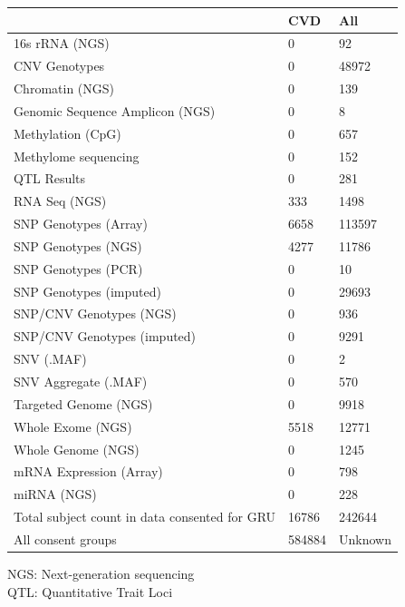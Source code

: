 \documentclass[letter]{bioinfo}
\begin{document}
	
			\begin{table}[]
{\begin{tabular}{l l l}
			\toprule
			& \textbf{CVD} &  \textbf{All}                         \\ \midrule
			16s rRNA (NGS)                 &     0 &      92 \\
			CNV Genotypes                  &     0 &   48972 \\
			Chromatin (NGS)                &     0 &     139 \\
			Genomic Sequence Amplicon (NGS)&     0 &       8 \\
			Methylation (CpG)              &     0 &     657 \\
			Methylome sequencing           &     0 &     152 \\
			QTL Results                    &     0 &     281 \\
			RNA Seq (NGS)                  &   333 &    1498 \\
			SNP Genotypes (Array)          &  6658 &  113597 \\
			SNP Genotypes (NGS)            &  4277 &   11786 \\
			SNP Genotypes (PCR)            &     0 &      10 \\
			SNP Genotypes (imputed)        &     0 &   29693 \\
			SNP/CNV Genotypes (NGS)        &     0 &     936 \\
			SNP/CNV Genotypes (imputed)    &     0 &    9291 \\
			SNV (.MAF)                     &     0 &       2 \\
			SNV Aggregate (.MAF)           &     0 &     570 \\
			Targeted Genome (NGS)          &     0 &    9918 \\
			Whole Exome (NGS)              &  5518 &   12771 \\
			Whole Genome (NGS)             &     0 &    1245 \\
			mRNA Expression (Array)        &     0 &     798 \\
			miRNA (NGS)                        & 0 &   228 \\ \hline
			Total subject count in data consented for GRU & 16786 & 242644 \\ \hline
			All consent groups & 584884 & Unknown \\	\hline
		\end{tabular}}{NGS: Next-generation sequencing\\ QTL: Quantitative Trait Loci}
	\end{table}
	
\end{document}
